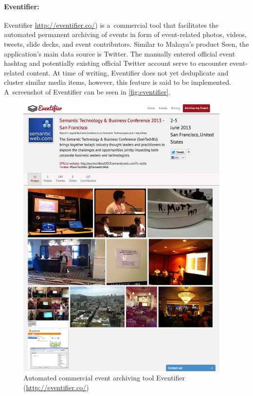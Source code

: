 \paragraph{Eventifier:}

Eventifier \url{http://eventifier.co/}) is a~commercial tool
that facilitates the automated permanent archiving of events
in form of event-related photos, videos, tweets, slide decks, 
and event contributors.
Similar to Mahaya's product Seen,
the application's main data source is Twitter.
The manually entered official event hashtag and potentially existing
official Twitter account serve to encounter event-related content.
At time of writing, Eventifier does not yet
deduplicate and cluster similar media items,
however, this feature is said to be implemented.
A~screenshot of Eventifier can be seen in \autoref{fig:eventifier}.

\begin{figure}
  \centering
  \includegraphics[width=0.95\textwidth,height=0.9\textheight,keepaspectratio]{eventifier.png}
  \caption[Automated commercial event archiving tool Eventifier]{Automated commercial event archiving tool Eventifier
    (\url{http://eventifier.co/})}
  \label{fig:eventifier}
\end{figure}

